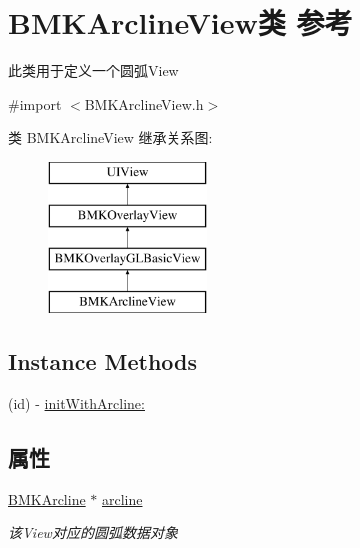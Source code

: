 \hypertarget{interface_b_m_k_arcline_view}{}\section{B\+M\+K\+Arcline\+View类 参考}
\label{interface_b_m_k_arcline_view}


此类用于定义一个圆弧\+View  




{\ttfamily \#import $<$B\+M\+K\+Arcline\+View.\+h$>$}

类 B\+M\+K\+Arcline\+View 继承关系图\+:\begin{figure}[H]
\begin{center}
\leavevmode
\includegraphics[height=4.000000cm]{interface_b_m_k_arcline_view}
\end{center}
\end{figure}
\subsection*{Instance Methods}
\begin{DoxyCompactItemize}
\item 
(id) -\/ \hyperlink{interface_b_m_k_arcline_view_ab5f05370f8d16895a04be3fb4168210a}{init\+With\+Arcline\+:}
\end{DoxyCompactItemize}
\subsection*{属性}
\begin{DoxyCompactItemize}
\item 
\hypertarget{interface_b_m_k_arcline_view_a824cf05f5bd4ff3790e78095ee72e6c2}{}\hyperlink{interface_b_m_k_arcline}{B\+M\+K\+Arcline} $\ast$ \hyperlink{interface_b_m_k_arcline_view_a824cf05f5bd4ff3790e78095ee72e6c2}{arcline}\label{interface_b_m_k_arcline_view_a824cf05f5bd4ff3790e78095ee72e6c2}

\begin{DoxyCompactList}\small\item\em 该\+View对应的圆弧数据对象 \end{DoxyCompactList}\end{DoxyCompactItemize}
